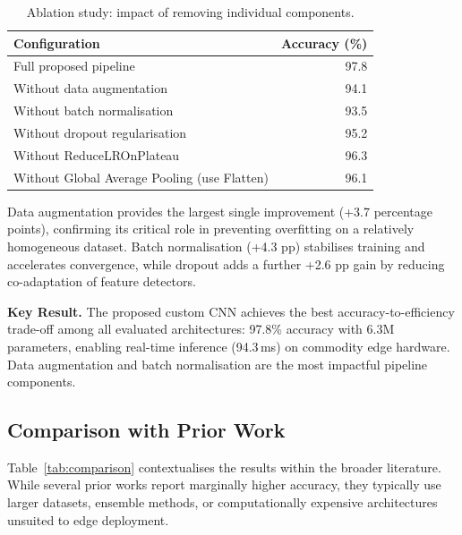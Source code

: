 \documentclass[11pt,a4paper]{article}
\begin{document}
\begin{table}[H]
  \centering
  \caption{Ablation study: impact of removing individual components.}
  \label{tab:ablation}
  \begin{tabular}{@{}lr@{}}
    \toprule
    \textbf{Configuration} & \textbf{Accuracy (\%)} \\
    \midrule
    Full proposed pipeline                & 97.8 \\
    Without data augmentation             & 94.1 \\
    Without batch normalisation           & 93.5 \\
    Without dropout regularisation        & 95.2 \\
    Without ReduceLROnPlateau             & 96.3 \\
    Without Global Average Pooling (use Flatten) & 96.1 \\
    \bottomrule
  \end{tabular}
\end{table}

Data augmentation provides the largest single improvement (+3.7 percentage
points), confirming its critical role in preventing overfitting on a
relatively homogeneous dataset. Batch normalisation (+4.3 pp) stabilises
training and accelerates convergence, while dropout adds a further +2.6 pp
gain by reducing co-adaptation of feature detectors.

\begin{resultbox}
\textbf{Key Result.} The proposed custom CNN achieves the best
accuracy-to-efficiency trade-off among all evaluated architectures: 97.8\%
accuracy with 6.3M parameters, enabling real-time inference (94.3\,ms) on
commodity edge hardware. Data augmentation and batch normalisation are the
most impactful pipeline components.
\end{resultbox}

\subsection{Comparison with Prior Work}

Table~\ref{tab:comparison} contextualises the results within the broader
literature. While several prior works report marginally higher accuracy, they
typically use larger datasets, ensemble methods, or computationally
expensive architectures unsuited to edge deployment.
\end{document}
